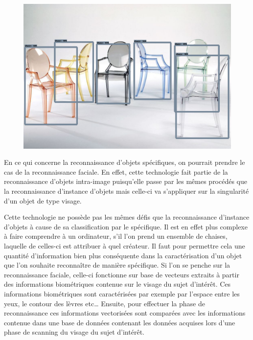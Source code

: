 \documentclass[a4paper,12pt]{article} %
\begin{document}
\newline
\begin{figure}[h] %
  \centering %
  \includegraphics[scale=0.2]{output.png} %
\end{figure}
\newpage
\par
En ce qui concerne la reconnaissance d’objets spécifiques, on pourrait prendre le cas de la reconnaissance faciale. En effet, cette technologie fait partie de la reconnaissance d’objets intra-image puisqu’elle passe par les mêmes procédés que la reconnaissance d’instance d’objets mais celle-ci va s’appliquer sur la singularité d’un objet de type visage. 
\newline
\par
Cette technologie ne possède pas les mêmes défis que la reconnaissance d’instance d’objets à cause de sa classification par le spécifique. Il est en effet plus complexe à faire comprendre à un ordinateur, s’il l’on prend un ensemble de chaises, laquelle de celles-ci est attribuer à quel créateur. Il faut pour permettre cela une quantité d’information bien plus conséquente dans la caractérisation d’un objet que l’on souhaite reconnaître de manière spécifique. Si l’on se penche sur la reconnaissance faciale, celle-ci fonctionne sur base de vecteurs extraits à partir des informations biométriques contenue sur le visage du sujet d’intérêt. Ces informations biométriques sont caractérisées par exemple par l’espace entre les yeux, le contour des lèvres etc… Ensuite, pour effectuer la phase de reconnaissance ces informations vectorisées sont comparées avec les informations contenue dans une base de données contenant les données acquises lors d’une phase de scanning du visage du sujet d’intérêt. 
\end{document}
